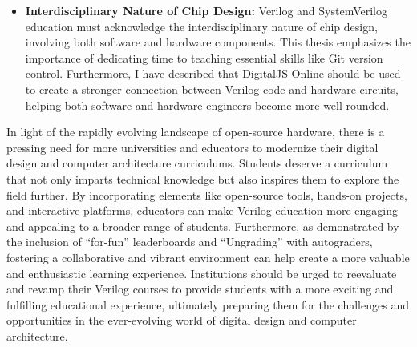 \begin{itemize}
    \item \textbf{Interdisciplinary Nature of Chip Design:} Verilog and SystemVerilog education must acknowledge the interdisciplinary nature of chip design, involving both software and hardware components. This thesis emphasizes the importance of dedicating time to teaching essential skills like Git version control. Furthermore, I have described that DigitalJS Online should be used to create a stronger connection between Verilog code and hardware circuits, helping both software and hardware engineers become more well-rounded.
\end{itemize}

In light of the rapidly evolving landscape of open-source hardware, there is a pressing need for more universities and educators to modernize their digital design and computer architecture curriculums. Students deserve a curriculum that not only imparts technical knowledge but also inspires them to explore the field further. By incorporating elements like open-source tools, hands-on projects, and interactive platforms, educators can make Verilog education more engaging and appealing to a broader range of students. Furthermore, as demonstrated by the inclusion of \enquote{for-fun} leaderboards and \enquote{Ungrading} with autograders, fostering a collaborative and vibrant environment can help create a more valuable and enthusiastic learning experience. Institutions should be urged to reevaluate and revamp their Verilog courses to provide students with a more exciting and fulfilling educational experience, ultimately preparing them for the challenges and opportunities in the ever-evolving world of digital design and computer architecture.
